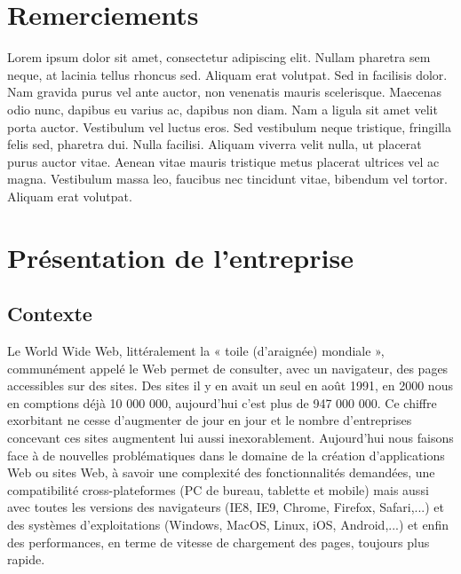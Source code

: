 \documentclass[a4paper,11pt,twoside]{report}
\begin{document}
\chapter*{Remerciements}
\thispagestyle{\chead{}}
Lorem ipsum dolor sit amet, consectetur adipiscing elit. Nullam pharetra sem neque, at lacinia tellus rhoncus sed. Aliquam erat volutpat. Sed in facilisis dolor. Nam gravida purus vel ante auctor, non venenatis mauris scelerisque. Maecenas odio nunc, dapibus eu varius ac, dapibus non diam. Nam a ligula sit amet velit porta auctor. Vestibulum vel luctus eros. Sed vestibulum neque tristique, fringilla felis sed, pharetra dui. Nulla facilisi. Aliquam viverra velit nulla, ut placerat purus auctor vitae. Aenean vitae mauris tristique metus placerat ultrices vel ac magna. Vestibulum massa leo, faucibus nec tincidunt vitae, bibendum vel tortor. Aliquam erat volutpat.

\tableofcontents
\thispagestyle{\chead{}}

\chapter{Présentation de l'entreprise}
  \section{Contexte}
  Le World Wide Web, littéralement la « toile (d’araignée) mondiale », communément appelé le Web permet de consulter, avec un navigateur, des pages accessibles sur des sites. Des sites il y en avait un seul en août 1991, en 2000 nous en comptions déjà 10 000 000, aujourd'hui c'est plus de 947 000 000. Ce chiffre exorbitant ne cesse d'augmenter de jour en jour et le nombre d'entreprises concevant ces sites augmentent lui aussi inexorablement. Aujourd'hui nous faisons face à de nouvelles problématiques dans le domaine de la création d'applications Web ou sites Web, à savoir une complexité des fonctionnalités demandées, une compatibilité cross-plateformes (PC de bureau, tablette et mobile) mais aussi avec toutes les versions des navigateurs (IE8, IE9, Chrome, Firefox, Safari,...) et des systèmes d'exploitations (Windows, MacOS, Linux, iOS, Android,...) et enfin des performances, en terme de vitesse de chargement des pages, toujours plus rapide.
  
\end{document}
